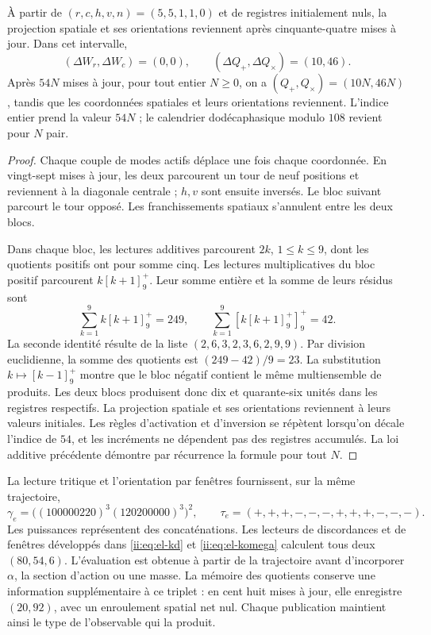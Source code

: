 \begin{proposition}
\label{ii:ii:electron-memoria-retorno}
À partir de \((r,c,h,v,n)=(5,5,1,1,0)\) et de registres initialement nuls, la
projection spatiale et ses orientations reviennent après cinquante-quatre
mises à jour. Dans cet intervalle,
\[
 (\Delta W_r,\Delta W_c)=(0,0),\qquad
 (\Delta Q_+,\Delta Q_\times)=(10,46).
\]
Après \(54N\) mises à jour, pour tout entier \(N\geq0\),
on a \((Q_+,Q_\times)=(10N,46N)\), tandis que les coordonnées
spatiales et leurs orientations reviennent. L'indice entier prend la valeur
\(54N\) ; le calendrier dodécaphasique modulo \(108\) revient pour
\(N\) pair.
\end{proposition}
\begin{proof}
Chaque couple de modes actifs déplace une fois chaque coordonnée. En
vingt-sept mises à jour, les deux parcourent un tour de neuf
positions et reviennent à la diagonale centrale ; \(h,v\) sont ensuite
inversés. Le bloc suivant parcourt le tour opposé. Les franchissements
spatiaux s'annulent entre les deux blocs.

Dans chaque bloc, les lectures additives parcourent \(2k\),
\(1\leq k\leq9\), dont les quotients positifs ont pour somme cinq. Les lectures
multiplicatives du bloc positif parcourent
\(k[k+1]^+_9\). Leur somme entière et la somme de leurs résidus sont
\[
 \sum_{k=1}^9 k[k+1]^+_9=249,\qquad
 \sum_{k=1}^9[k[k+1]^+_9]^+_9=42.
\]
La seconde identité résulte de la liste
\((2,6,3,2,3,6,2,9,9)\). Par division euclidienne,
la somme des quotients est \((249-42)/9=23\). La substitution
\(k\mapsto[k-1]^+_9\) montre que le bloc négatif contient
le même multiensemble de produits. Les deux blocs produisent donc
dix et quarante-six unités dans les registres respectifs.
La projection spatiale et ses orientations reviennent à leurs valeurs
initiales. Les règles d'activation et d'inversion se répètent lorsqu'on
décale l'indice de \(54\), et les incréments ne dépendent pas des
registres accumulés. La loi additive
précédente démontre par récurrence la formule pour tout \(N\).
\end{proof}

La lecture tritique et l'orientation par fenêtres fournissent, sur
la même trajectoire,
\[
 \gamma_e=\bigl((100000220)^3(120200000)^3\bigr)^2,\qquad
 \tau_e=(+,+,+,-,-,-,+,+,+,-,-,-).
\]
Les puissances représentent des concaténations. Les lecteurs de
discordances et de fenêtres développés dans
\eqref{ii:eq:el-kd} et \eqref{ii:eq:el-komega} calculent tous deux
\((80,54,6)\). L'évaluation est obtenue à partir de la trajectoire avant
d'incorporer \(\alpha\), la section d'action ou une masse.
La mémoire des quotients conserve une information supplémentaire à ce triplet :
en cent huit mises à jour, elle enregistre \((20,92)\), avec un
enroulement spatial net nul. Chaque publication maintient ainsi le
type de l'observable qui la produit.

